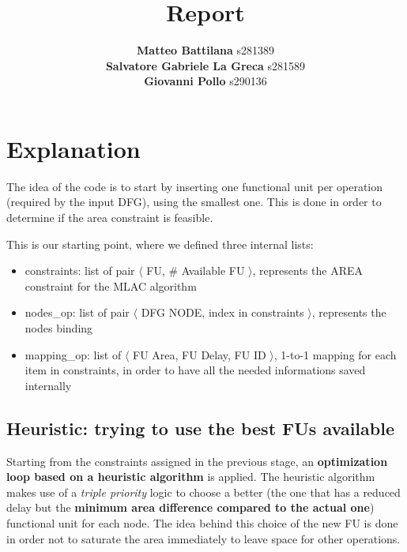 \documentclass{article}
\title{\Huge Report}
\author{
\large \textbf{Matteo Battilana} s281389 \\
\large \textbf{Salvatore Gabriele La Greca} s281589 \\
\large \textbf{Giovanni Pollo} s290136}
\date{}
\begin{document}
\begin{titlepage}
    \centering
    \vspace{2px}
  \end{titlepage}
  \maketitle
  \thispagestyle{empty}

  \newpage

  \thispagestyle{empty}

  \section{Explanation}

  The idea of the code is to start by inserting one functional unit per operation (required by the input DFG), using the smallest one. This is done in order to determine if the area constraint is feasible.
  
  This is our starting point, where we defined three internal lists:

  \begin{itemize}
    \item constraints: list of pair $\langle$ FU, \# Available FU $\rangle$, represents the AREA constraint for the MLAC algorithm
    \item nodes\_op: list of pair $\langle$ DFG NODE, index in constraints $\rangle$, represents the nodes binding
    \item mapping\_op: list of $\langle$ FU Area, FU Delay, FU ID $\rangle$, 1-to-1 mapping for each item in constraints, in order to have all the needed informations saved internally
  \end{itemize}

  \subsection{Heuristic: trying to use the best FUs available}

  Starting from the constraints assigned in the previous stage, an \textbf{optimization loop based on a heuristic algorithm} is applied. The heuristic algorithm makes use of a \textit{triple priority} logic to choose a better (the one that has a reduced delay but the \textbf{minimum area difference compared to the actual one}) functional unit for each node. The idea behind this choice of the new FU is done in order not to saturate the area immediately to leave space for other operations.
\end{document}

